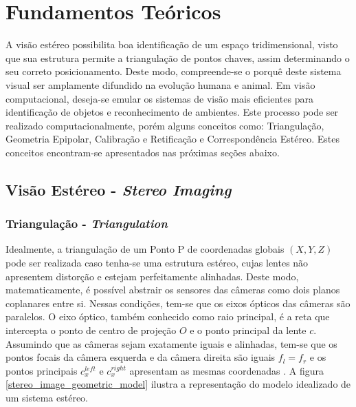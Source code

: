 \chapter{Fundamentos Teóricos}
\label{Revisão Bibliográfica}


A visão estéreo possibilita boa identificação de um espaço tridimensional, visto que sua estrutura permite a triangulação de pontos chaves, assim determinando o seu correto posicionamento. Deste modo, compreende-se o porquê deste sistema visual ser amplamente difundido na evolução humana e animal. Em visão computacional, deseja-se emular os sistemas de visão mais eficientes para identificação de objetos e reconhecimento de ambientes. Este processo pode ser realizado  computacionalmente, porém alguns conceitos como: Triangulação, Geometria Epipolar, Calibração e Retificação e Correspondência Estéreo. Estes conceitos encontram-se apresentados nas próximas seções abaixo.


\section{Visão Estéreo - \textit{Stereo Imaging}}
\subsection{Triangulação - \textit{Triangulation}}

Idealmente, a triangulação de um Ponto P de coordenadas globais $(X,Y,Z)$ pode ser realizada caso tenha-se uma estrutura estéreo, cujas lentes não apresentem distorção e estejam perfeitamente alinhadas. Deste modo, matematicamente, é possível abstrair os sensores das câmeras como dois planos coplanares entre si. Nessas condições, tem-se que os eixos ópticos das câmeras são paralelos. O eixo óptico, também conhecido como raio principal, é a reta que intercepta o ponto de centro de projeção ${O}$ e o ponto principal da lente ${c}$. Assumindo que as câmeras sejam exatamente iguais e alinhadas, tem-se que os pontos focais da câmera esquerda e da câmera direita são iguais ${f_l = f_r}$ e os pontos principais ${c^{left}_x}$ e  ${c^{right}_x}$ apresentam as mesmas coordenadas \cite{Bradski2008}. A figura \ref{stereo_image_geometric_model} ilustra a representação do modelo idealizado de um sistema estéreo.

